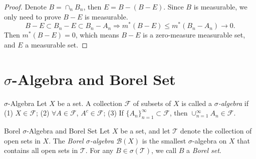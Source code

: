 \begin{proof}
  Denote $B = \cap _n B_n$, then $E = B - (B - E)$.
  Since $B$ is measurable, we only need to prove $B - E$ is measurable.
  \begin{equation}
    B - E \subset B_n - E \subset B_n - A_n \Rightarrow m^{\ast}(B - E) \leq m^{\ast}(B_n - A_n) \rightarrow 0.
  \end{equation}
  Then $m^{\ast}(B - E) = 0$, which means $B - E$ is a zero-measure measurable set,
  and $E$ a measurable set.
\end{proof}

\section{$\sigma$-Algebra and Borel Set}

\begin{definition}{$\sigma$-Algebra}{}
  Let $X$ be a set. A collection $\mathcal{F}$ of subsets of $X$ is called a
  \emph{$\sigma$-algebra} if
  (1) $X \in \mathcal{F}$;
  (2) $\forall A \in \mathcal{F}$, $A^c \in \mathcal{F}$;
  (3) If $\{A_n\}_{n=1}^{\infty} \subset \mathcal{F}$, then $\cup _{n = 1}^{\infty} A_n \in \mathcal{F}$.
\end{definition}

\begin{definition}{Borel $\sigma$-Algebra and Borel Set}{}
  Let $X$ be a set,
  and let $\mathcal{T}$ denote the collection of open sets in $X$.
  The \emph{Borel $\sigma$-algebra $\mathcal{B}(X)$} is the smallest $\sigma$-algebra
  on $X$ that contains all open sets in $\mathcal{T}$.
  For any $B \in \sigma(\mathcal{T})$,
  we call $B$ a \emph{Borel set}.
\end{definition}




